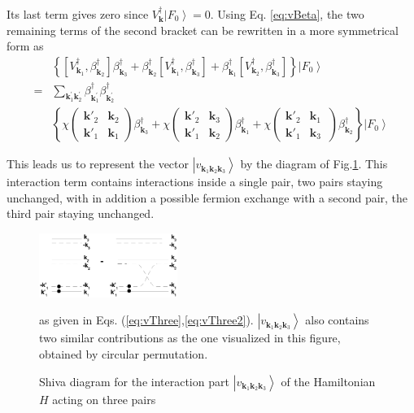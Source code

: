 \documentclass[aps,prb,superscriptaddress,twocolumn]{revtex4}
\newcommand{\vk}{\ensuremath{\mathbf{k}}}
\begin{document}
Its last term gives zero since $V^{\dagger}_\vk\left|F_0\right>  =0$. Using
Eq. \eqref{eq:vBeta}, the two remaining terms of the second bracket can be
rewritten in a more symmetrical form as 
\begin{equation}  \label{eq:vThree2}
\begin{split}
&\left\{\left[V^{\dagger}_{\mathbf{k} _1},\beta^{\dagger}_{\mathbf{k} _2}%
\right]  \beta^{\dagger}_{\mathbf{k} _3}+\beta^{\dagger}_{\mathbf{k} _2}%
\left[V^{\dagger}_{\mathbf{k} _1},\beta^{\dagger}_{\mathbf{k} _3}\right] 
+\beta^{\dagger}_{\mathbf{k} _1}\left[V^{\dagger}_{\mathbf{k}
_2},\beta^{\dagger}_{\mathbf{k} _3}\right]  \right\} \left|F_0\right>   \\
=&\sum_{\vk^{\prime}_1\mathbf{k} ^{\prime}_2}\beta^{\dagger}_{\mathbf{k}
^{\prime}_1}\beta^{\dagger}_{\mathbf{k} ^{\prime}_2} \\
&\left\{\chi\left(\begin{smallmatrix}\vk'_2&\vk_2\\\vk'_1&\vk_1%
\end{smallmatrix}\right)  \beta^{\dagger}_{\mathbf{k} _3}+\chi\left(%
\begin{smallmatrix}\vk'_2&\vk_3\\\vk'_1&\vk_2\end{smallmatrix}\right) 
\beta^{\dagger}_{\mathbf{k} _1}+\chi\left(\begin{smallmatrix}\vk'_2&\vk_1\
\\\vk'_1&\vk_3\end{smallmatrix}\right)  \beta^{\dagger}_{\mathbf{k}
_2}\right\} \left|F_0\right>  
\end{split}%
\end{equation}

This leads us to represent the vector $\left|v_{\mathbf{k} _1\mathbf{k} _2%
\mathbf{k} _3}\right> $ by the diagram of Fig.\ref{fig:threeP}. This
interaction term contains interactions inside a single pair, two pairs
staying unchanged, with in addition a possible fermion exchange with a
second pair, the third pair staying unchanged. 
\begin{figure}[htb]
\caption{Shiva diagram for the interaction part $\left|v_{\mathbf{k} _1\mathbf{k} _2%
\mathbf{k} _3}\right> $ of the Hamiltonian $H$ acting on three pairs }
\label{fig:threeP}
   \includegraphics[width=0.4\textwidth]{threePair.eps}
   
 as given in Eqs. (\ref{eq:vThree},\ref{eq:vThree2}). $\left|v_{\mathbf{k} _1\mathbf{k} _2%
\mathbf{k} _3}\right> $ also contains two similar contributions as the one
visualized in this figure, obtained by circular permutation.
\end{figure}
\end{document}
